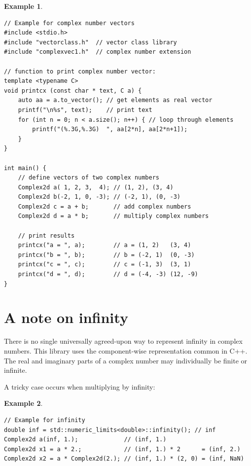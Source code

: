 \documentclass[11pt,a4paper,oneside,openright]{report}
\newtheorem{example}{Example}[chapter]  %
\newcommand{\vspacesmall}{\vspace{3mm}}
\begin{document}
\begin{example}
\label{exampleComplexAddMul}
\end{example} %
\begin{lstlisting}[frame=single]
// Example for complex number vectors
#include <stdio.h>
#include "vectorclass.h"  // vector class library
#include "complexvec1.h"  // complex number extension

// function to print complex number vector:
template <typename C>
void printcx (const char * text, C a) {
    auto aa = a.to_vector(); // get elements as real vector
    printf("\n%s", text);    // print text
    for (int n = 0; n < a.size(); n++) { // loop through elements
        printf("(%.3G,%.3G)  ", aa[2*n], aa[2*n+1]);
    }
}

int main() {
    // define vectors of two complex numbers
    Complex2d a( 1, 2, 3,  4); // (1, 2), (3, 4)
    Complex2d b(-2, 1, 0, -3); // (-2, 1), (0, -3)
    Complex2d c = a + b;       // add complex numbers
    Complex2d d = a * b;       // multiply complex numbers

    // print results
    printcx("a = ", a);        // a = (1, 2)   (3, 4)
    printcx("b = ", b);        // b = (-2, 1)  (0, -3)
    printcx("c = ", c);        // c = (-1, 3)  (3, 1)
    printcx("d = ", d);        // d = (-4, -3) (12, -9)
}
\end{lstlisting}
\vspacesmall


\section{A note on infinity} \label{Infinity}
There is no single universally agreed-upon way to represent infinity in complex numbers. This library uses the component-wise representation common in C++. The real and imaginary parts of a complex number may individually be finite or infinite. 
\vspacesmall

A tricky case occurs when multiplying by infinity:

\begin{example}
\label{exampleInfinity}
\end{example} %
\begin{lstlisting}[frame=single]
// Example for infinity
double inf = std::numeric_limits<double>::infinity(); // inf
Complex2d a(inf, 1.);             // (inf, 1.)
Complex2d x1 = a * 2.;            // (inf, 1.) * 2      = (inf, 2.)
Complex2d x2 = a * Complex2d(2.); // (inf, 1.) * (2, 0) = (inf, NaN)
\end{lstlisting}
\vspacesmall
\end{document}
